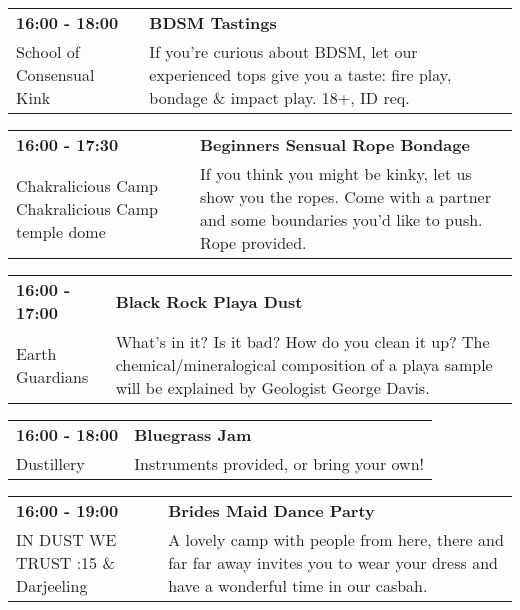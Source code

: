 \begin{tabular}{ p{1in} p{2.2in} }
    \textbf{16:00 - 18:00} & \textbf{BDSM Tastings} \\
    School of Consensual Kink \newline  & If you're curious about BDSM, let our experienced tops give you a taste: fire play, bondage \& impact play. 18+, ID req. \\
    \hline 
\end{tabular}
    
\begin{tabular}{ p{1in} p{2.2in} }
    \textbf{16:00 - 17:30} & \textbf{Beginners Sensual Rope Bondage} \\
    Chakralicious Camp \newline Chakralicious Camp temple dome & If you think you might be kinky, let us show you the ropes. Come with a partner and some boundaries you'd like to push. Rope provided. \\
    \hline 
\end{tabular}
    
\begin{tabular}{ p{1in} p{2.2in} }
    \textbf{16:00 - 17:00} & \textbf{Black Rock Playa Dust} \\
    Earth Guardians \newline  & What's in it? Is it bad? How do you clean it up? The chemical/mineralogical composition of a playa sample will be explained by Geologist George Davis. \\
    \hline 
\end{tabular}
    
\begin{tabular}{ p{1in} p{2.2in} }
    \textbf{16:00 - 18:00} & \textbf{Bluegrass Jam} \\
    Dustillery \newline  & Instruments provided, or bring your own! \\
    \hline 
\end{tabular}
    
\begin{tabular}{ p{1in} p{2.2in} }
    \textbf{16:00 - 19:00} & \textbf{Brides Maid Dance Party} \\
    IN DUST WE TRUST \newline 5:15 \& Darjeeling & A lovely camp with people from here, there and far far away invites you to wear your dress and have a wonderful time in our casbah. \\
    \hline 
\end{tabular}
    
